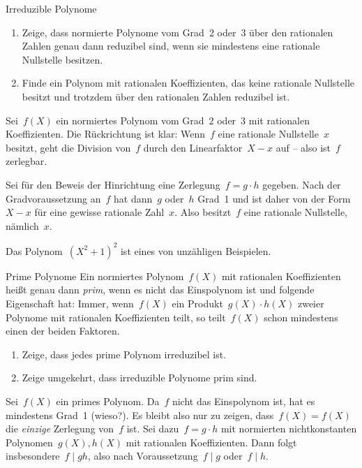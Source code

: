 \documentclass{algblatt}
\begin{document}
\begin{aufgabe}{Irreduzible Polynome}
\begin{enumerate}
\item Zeige, dass normierte Polynome vom Grad~2 oder~3 über den rationalen
Zahlen genau dann reduzibel sind, wenn sie mindestens eine rationale Nullstelle
besitzen.
\item Finde ein Polynom mit rationalen Koeffizienten, das keine rationale
Nullstelle besitzt und trotzdem über den rationalen Zahlen reduzibel ist.
\end{enumerate}

\begin{loesungE}
\item Sei~$f(X)$ ein normiertes Polynom vom Grad~2 oder~3 mit rationalen
Koeffizienten. Die Rückrichtung ist klar: Wenn~$f$ eine rationale
Nullstelle~$x$ besitzt, geht die Division von~$f$ durch den Linearfaktor~$X-x$
auf -- also ist~$f$ zerlegbar.

Sei für den Beweis der Hinrichtung eine Zerlegung~$f = g \cdot h$ gegeben. Nach
der Gradvoraussetzung an~$f$ hat dann~$g$ oder~$h$ Grad~1 und ist daher von der
Form~$X-x$ für eine gewisse rationale Zahl~$x$. Also besitzt~$f$ eine rationale
Nullstelle, nämlich~$x$.

\item Das Polynom~$(X^2+1)^2$ ist eines von unzähligen Beispielen.
\end{loesungE}
\end{aufgabe}

\begin{aufgabe}{Prime Polynome}
Ein normiertes Polynom~$f(X)$ mit rationalen Koeffizienten heißt genau
dann \emph{prim}, wenn es nicht das Einspolynom ist und folgende Eigenschaft
hat: Immer, wenn~$f(X)$ ein Produkt~$g(X) \cdot h(X)$ zweier Polynome mit
rationalen Koeffizienten teilt, so teilt~$f(X)$ schon mindestens einen der
beiden Faktoren.
\begin{enumerate}
\item Zeige, dass jedes prime Polynom irreduzibel ist.
\item Zeige umgekehrt, dass irreduzible Polynome prim sind.
\end{enumerate}

\begin{loesungE}
\item Sei~$f(X)$ ein primes Polynom. Da~$f$ nicht das Einspolynom ist, hat es
mindestens Grad~1 (wieso?). Es bleibt also nur zu zeigen, dass~$f(X) = f(X)$
die \emph{einzige} Zerlegung von~$f$ ist. Sei dazu~$f = g \cdot h$ mit
normierten nichtkonstanten Polynomen~$g(X), h(X)$ mit rationalen Koeffizienten. Dann folgt
insbesondere~$f \mid gh$, also nach Voraussetzung~$f \mid g$ oder~$f \mid h$.
\end{loesungE}
\end{aufgabe}
\end{document}
